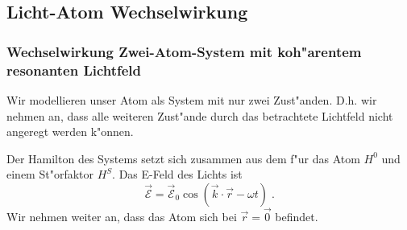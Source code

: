 \documentclass[a4paper,draft]{article}
\begin{document}









\subsection{Licht-Atom Wechselwirkung}
\label{sec:lichat_atom_wechselwirkung}


\subsubsection{Wechselwirkung Zwei-Atom-System mit koh"arentem resonanten Lichtfeld}
\label{sec:wechselwirkung_zwei_atom_system_mit}

Wir modellieren unser Atom als System mit nur zwei
Zust"anden. D.h. wir nehmen an, dass alle weiteren Zust"ande durch das
betrachtete Lichtfeld nicht angeregt werden k"onnen.

Der Hamilton des Systems setzt sich zusammen aus dem f"ur das Atom
$H^0$ und einem St"orfaktor $H^S$. Das E-Feld des Lichts ist
\begin{equation*}
  \vec {\mathcal E} = \vec {\mathcal E}_0 \cos(\vec k \cdot \vec r -
  \omega t) \;.
\end{equation*}
Wir nehmen weiter an, dass das Atom sich bei $\vec r = \vec 0$
befindet. 
\end{document}
